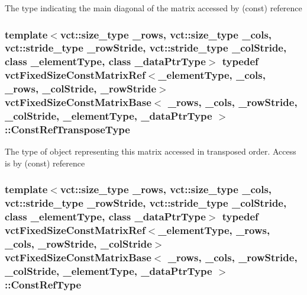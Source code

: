 The type indicating the main diagonal of the matrix accessed by (const) reference \hypertarget{classvct_fixed_size_const_matrix_base_a41d41a9a3dc6d0c8e36348a8c2fc83db}{
\subsubsection[{Const\-Ref\-Transpose\-Type}]{\setlength{\rightskip}{0pt plus 5cm}template$<$vct\-::size\-\_\-type \-\_\-rows, vct\-::size\-\_\-type \-\_\-cols, vct\-::stride\-\_\-type \-\_\-row\-Stride, vct\-::stride\-\_\-type \-\_\-col\-Stride, class \-\_\-element\-Type, class \-\_\-data\-Ptr\-Type$>$ typedef {\bf vct\-Fixed\-Size\-Const\-Matrix\-Ref}$<$\-\_\-element\-Type, \-\_\-cols, \-\_\-rows, \-\_\-col\-Stride, \-\_\-row\-Stride$>$ {\bf vct\-Fixed\-Size\-Const\-Matrix\-Base}$<$ \-\_\-rows, \-\_\-cols, \-\_\-row\-Stride, \-\_\-col\-Stride, \-\_\-element\-Type, \-\_\-data\-Ptr\-Type $>$\-::{\bf Const\-Ref\-Transpose\-Type}}}\label{classvct_fixed_size_const_matrix_base_a41d41a9a3dc6d0c8e36348a8c2fc83db}
The type of object representing this matrix accessed in transposed order. Access is by (const) reference \hypertarget{classvct_fixed_size_const_matrix_base_a457385fe6e0a82182be90728b60cca79}{
\subsubsection[{Const\-Ref\-Type}]{\setlength{\rightskip}{0pt plus 5cm}template$<$vct\-::size\-\_\-type \-\_\-rows, vct\-::size\-\_\-type \-\_\-cols, vct\-::stride\-\_\-type \-\_\-row\-Stride, vct\-::stride\-\_\-type \-\_\-col\-Stride, class \-\_\-element\-Type, class \-\_\-data\-Ptr\-Type$>$ typedef {\bf vct\-Fixed\-Size\-Const\-Matrix\-Ref}$<$\-\_\-element\-Type, \-\_\-rows, \-\_\-cols, \-\_\-row\-Stride, \-\_\-col\-Stride$>$ {\bf vct\-Fixed\-Size\-Const\-Matrix\-Base}$<$ \-\_\-rows, \-\_\-cols, \-\_\-row\-Stride, \-\_\-col\-Stride, \-\_\-element\-Type, \-\_\-data\-Ptr\-Type $>$\-::{\bf Const\-Ref\-Type}}}\label{classvct_fixed_size_const_matrix_base_a457385fe6e0a82182be90728b60cca79}
